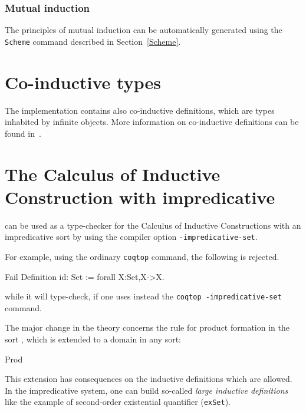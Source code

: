 
\subsubsection{Mutual induction}

The principles of mutual induction can be automatically generated 
using the {\tt Scheme} command described in Section~\ref{Scheme}.

\section{Co-inductive types}
The implementation contains also co-inductive definitions, which are
types inhabited by infinite objects. 
More information on co-inductive definitions can be found
in~\cite{Gimenez95b,Gim98,GimCas05}.

\section[The Calculus of Inductive Construction with
  impredicative \Set]{The Calculus of Inductive Construction with
  impredicative \Set\label{impredicativity}}

\Coq{} can be used as a type-checker for the
Calculus of Inductive Constructions with an impredicative sort \Set{}
by using the compiler option \texttt{-impredicative-set}.

For example, using the ordinary \texttt{coqtop} command, the following
is rejected.
\begin{coq_example}
Fail Definition id: Set := forall X:Set,X->X.
\end{coq_example}
while it will type-check, if one uses instead the \texttt{coqtop
  -impredicative-set} command.

The major change in the theory concerns the rule for product formation
in the sort \Set, which is extended to a domain in any sort:
\begin{description}
\item [Prod]  
\end{description}
This extension has consequences on the inductive definitions which are
allowed. 
In the impredicative system, one can build so-called {\em large inductive
  definitions} like the example of second-order existential
quantifier (\texttt{exSet}).

